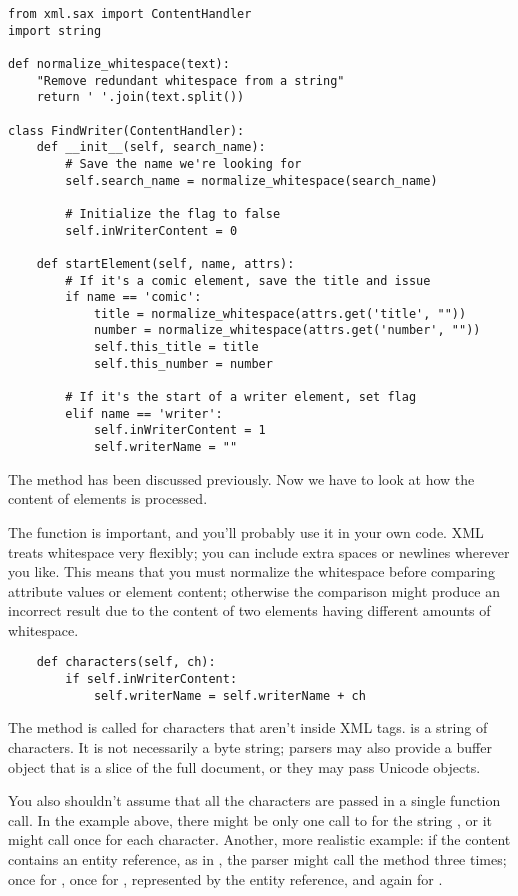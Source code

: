 \documentclass{howto}
\begin{document}
\begin{verbatim}
from xml.sax import ContentHandler
import string

def normalize_whitespace(text):
    "Remove redundant whitespace from a string"
    return ' '.join(text.split())

class FindWriter(ContentHandler):
    def __init__(self, search_name):
        # Save the name we're looking for
        self.search_name = normalize_whitespace(search_name)

        # Initialize the flag to false
        self.inWriterContent = 0

    def startElement(self, name, attrs):
        # If it's a comic element, save the title and issue
        if name == 'comic':
            title = normalize_whitespace(attrs.get('title', ""))
            number = normalize_whitespace(attrs.get('number', ""))
            self.this_title = title
            self.this_number = number

        # If it's the start of a writer element, set flag
        elif name == 'writer':
            self.inWriterContent = 1
            self.writerName = ""
\end{verbatim}

The  method has been discussed previously.  Now
we have to look at how the content of elements is processed.  

The  function is important, and
you'll probably use it in your own code.  XML treats whitespace very
flexibly; you can include extra spaces or newlines wherever you like.
This means that you must normalize the whitespace before comparing
attribute values or element content; otherwise the comparison might
produce an incorrect result due to the content of two elements having
different amounts of whitespace.

\begin{verbatim}
    def characters(self, ch):
        if self.inWriterContent:
            self.writerName = self.writerName + ch
\end{verbatim}

The  method is called for characters that aren't
inside XML tags.   is a string of characters. It is not
necessarily a byte string; parsers may also provide a buffer object
that is a slice of the full document, or they may pass Unicode
objects.

You also shouldn't assume that all the characters are passed in a
single function call.  In the example above, there might be only one
call to  for the string , or
it might call  once for each character.  Another,
more realistic example: if the content contains an entity reference,
as in , the parser might call the method
three times; once for , once for \samp{\&}, represented
by the entity reference, and again for .
\end{document}
